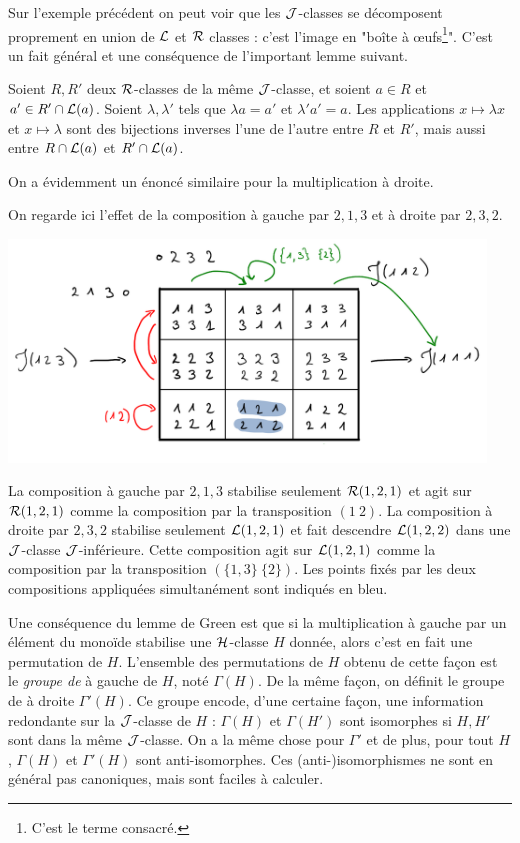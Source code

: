 \documentclass{article}
\begin{document}
	Sur l'exemple précédent on peut voir que les $\mathcal{J}$-classes se décomposent proprement en union de $\mathcal{L}$ et $\mathcal{R}$ classes : c'est l'image en "boîte à \oe{}ufs\footnote{C'est le terme consacré.}". C'est un fait général et une conséquence de l'important lemme suivant.
	
	\begin{lemme}
		Soient $R, R'$ deux $\mathcal{R}$-classes de la même $\mathcal{J}$-classe, et soient $a \in R$ et $a' \in R' \cap \mathcal{L}(a)$. Soient $\lambda, \lambda'$ tels que $\lambda a = a'$ et $\lambda' a' = a$. Les applications $x \mapsto \lambda x$ et $x \mapsto \lambda$ sont des bijections inverses l'une de l'autre entre $R$ et $R'$, mais aussi entre $R \cap \mathcal{L}(a)$ et $R' \cap \mathcal{L}(a)$.
	\end{lemme}

	On a évidemment un énoncé similaire pour la multiplication à droite. 
	
	\begin{lined}
		\begin{ex}
		On regarde ici l'effet de la composition à gauche par $2,1,3$ et à droite par $2,3,2$.
		
		{\centering
		\includegraphics[width=0.95\textwidth]{./green.png}}
	
		La composition à gauche par $2,1,3$ stabilise seulement $\mathcal{R}(1, 2, 1)$ et agit sur $\mathcal{R}(1, 2, 1)$ comme la composition par la transposition $(1\ 2)$.
		La composition à droite par $2, 3, 2$ stabilise seulement $\mathcal{L}(1, 2, 1)$ et fait descendre $\mathcal{L}(1, 2, 2)$ dans une $\mathcal{J}$-classe $\mathcal{J}$-inférieure. Cette composition agit sur $\mathcal{L}(1, 2, 1)$ comme la composition par la transposition $(\{1, 3\}\ \{2\})$. Les points fixés par les deux compositions appliquées simultanément sont indiqués en bleu.
		\end{ex}
	\end{lined}

	Une conséquence du lemme de Green est que si la multiplication à gauche par un élément du monoïde stabilise une $\mathcal{H}$-classe $H$ donnée, alors c'est en fait une permutation de $H$. L'ensemble des permutations de $H$ obtenu de cette façon est le \emph{groupe de \schu} à gauche de $H$, noté $\Gamma(H)$. De la même façon, on définit le groupe de \schu à droite $\Gamma'(H)$. Ce groupe encode, d'une certaine façon, une information redondante sur la $\mathcal{J}$-classe de $H$ : $\Gamma(H)$ et $\Gamma(H')$ sont isomorphes si $H, H'$ sont dans la même $\mathcal{J}$-classe. On a la même chose pour $\Gamma'$ et de plus, pour tout $H$, $\Gamma(H)$ et $\Gamma'(H)$ sont anti-isomorphes. Ces (anti-)isomorphismes ne sont en général pas canoniques, mais sont faciles à calculer.
	
\end{document}
